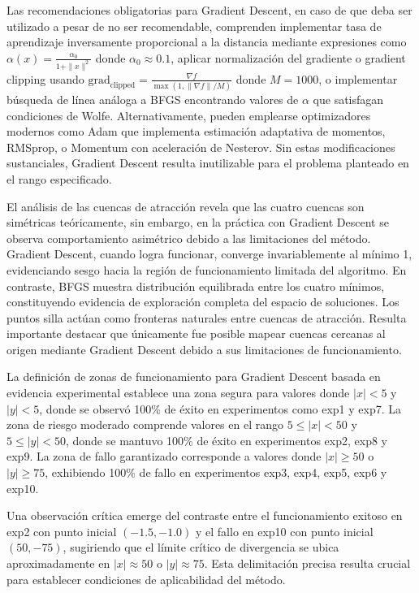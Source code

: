 \documentclass[12pt,a4paper]{article}
\begin{document}
Las recomendaciones obligatorias para Gradient Descent, en caso de que deba ser utilizado a pesar de no ser recomendable, comprenden implementar tasa de aprendizaje inversamente proporcional a la distancia mediante expresiones como $\alpha(x) = \frac{\alpha_0}{1 + \|x\|^2}$ donde $\alpha_0 \approx 0.1$, aplicar normalización del gradiente o gradient clipping usando $\text{grad}_{\text{clipped}} = \frac{\nabla f}{\max(1, \|\nabla f\|/M)}$ donde $M = 1000$, o implementar búsqueda de línea análoga a BFGS encontrando valores de $\alpha$ que satisfagan condiciones de Wolfe. Alternativamente, pueden emplearse optimizadores modernos como Adam que implementa estimación adaptativa de momentos, RMSprop, o Momentum con aceleración de Nesterov. Sin estas modificaciones sustanciales, Gradient Descent resulta inutilizable para el problema planteado en el rango especificado.

El análisis de las cuencas de atracción revela que las cuatro cuencas son simétricas teóricamente, sin embargo, en la práctica con Gradient Descent se observa comportamiento asimétrico debido a las limitaciones del método. Gradient Descent, cuando logra funcionar, converge invariablemente al mínimo 1, evidenciando sesgo hacia la región de funcionamiento limitada del algoritmo. En contraste, BFGS muestra distribución equilibrada entre los cuatro mínimos, constituyendo evidencia de exploración completa del espacio de soluciones. Los puntos silla actúan como fronteras naturales entre cuencas de atracción. Resulta importante destacar que únicamente fue posible mapear cuencas cercanas al origen mediante Gradient Descent debido a sus limitaciones de funcionamiento.

La definición de zonas de funcionamiento para Gradient Descent basada en evidencia experimental establece una zona segura para valores donde $|x| < 5$ y $|y| < 5$, donde se observó 100\% de éxito en experimentos como exp1 y exp7. La zona de riesgo moderado comprende valores en el rango $5 \leq |x| < 50$ y $5 \leq |y| < 50$, donde se mantuvo 100\% de éxito en experimentos exp2, exp8 y exp9. La zona de fallo garantizado corresponde a valores donde $|x| \geq 50$ o $|y| \geq 75$, exhibiendo 100\% de fallo en experimentos exp3, exp4, exp5, exp6 y exp10.

Una observación crítica emerge del contraste entre el funcionamiento exitoso en exp2 con punto inicial $(-1.5, -1.0)$ y el fallo en exp10 con punto inicial $(50, -75)$, sugiriendo que el límite crítico de divergencia se ubica aproximadamente en $|x| \approx 50$ o $|y| \approx 75$. Esta delimitación precisa resulta crucial para establecer condiciones de aplicabilidad del método.
\end{document}
